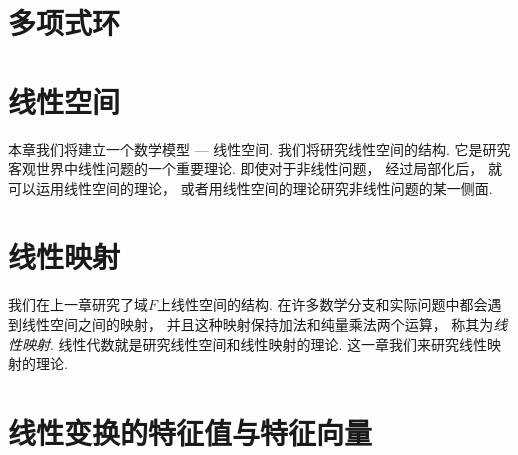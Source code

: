 \chapter{多项式环}













\chapter{线性空间}
本章我们将建立一个数学模型 --- 线性空间.
我们将研究线性空间的结构.
它是研究客观世界中线性问题的一个重要理论.
即使对于非线性问题，
经过局部化后，
就可以运用线性空间的理论，
或者用线性空间的理论研究非线性问题的某一侧面.






\chapter{线性映射}
我们在上一章研究了域\(F\)上线性空间的结构.
在许多数学分支和实际问题中都会遇到线性空间之间的映射，
并且这种映射保持加法和纯量乘法两个运算，
称其为\emph{线性映射}.
线性代数就是研究线性空间和线性映射的理论.
这一章我们来研究线性映射的理论.






\chapter{线性变换的特征值与特征向量}
\begingroup
\NewDocumentCommand{}%
\NewDocumentCommand{}%
\NewDocumentCommand{}%
\NewDocumentCommand{}%
\NewDocumentCommand{}%
\NewDocumentCommand{}%






\endgroup

